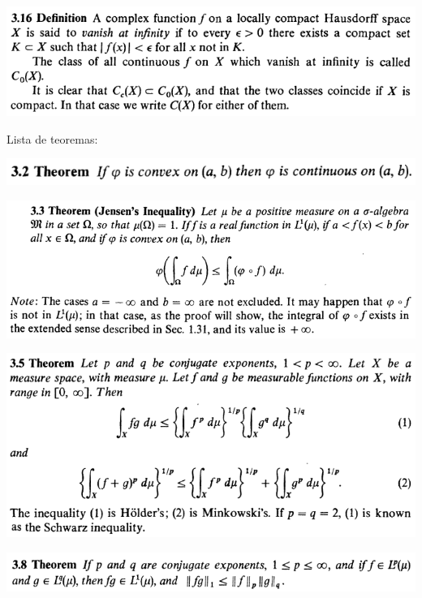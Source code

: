 \documentclass[12pt]{article}
\begin{document}
		\begin{center}
		\includegraphics{d3ponto16}
		\end{center}

Lista de teoremas:

		\begin{center}
		\includegraphics{3ponto2}
		\end{center}

		\begin{center}
		\includegraphics[scale=0.9]{3ponto3}
		\end{center}

		\begin{center}
		\includegraphics{3ponto5}
		\end{center}

		\begin{center}
		\includegraphics{3ponto8}
		\end{center}
\end{document}
